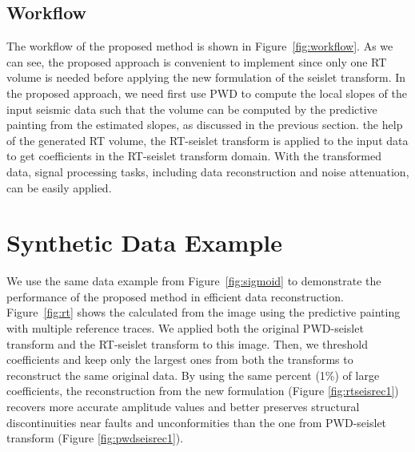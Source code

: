 \subsection{Workflow}
    The workflow of the proposed method is shown in Figure~\ref{fig:workflow}. 
    As we can see, the proposed approach is convenient to implement since only 
    one RT volume is needed before applying the new formulation of the seislet 
    transform. 
    In the proposed approach, we need first use PWD to compute the local slopes 
    of the input seismic data such that the  volume 
    can be computed by the predictive painting from the estimated slopes, as 
    discussed in the previous section. 
     the help of the generated RT volume, the RT-seislet transform is 
     applied to the input data to get coefficients in the RT-seislet transform 
    domain. 
    With the transformed data, signal processing tasks, including data 
    reconstruction and noise attenuation, can be easily applied.


\section{Synthetic Data Example}
    We use the same data example from Figure~\ref{fig:sigmoid} to demonstrate 
    the performance of the proposed method in ef{}ficient data reconstruction. 
    Figure~\ref{fig:rt} shows the  calculated from 
    the image using the predictive painting with multiple reference traces. 
    We applied both the original PWD-seislet transform and the RT-seislet 
    transform to this image. 
    Then, we threshold coefficients and keep only the largest ones from both the 
    transforms to reconstruct the same original data. 
    By using the same percent (1\%) of large coefficients, the reconstruction 
    from the new formulation (Figure \ref{fig:rtseisrec1}) recovers more 
    accurate amplitude values and better preserves structural discontinuities 
    near faults and unconformities than the one from PWD-seislet transform 
    (Figure \ref{fig:pwdseisrec1}).
    

